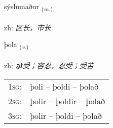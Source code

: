 \documentclass[frontgrid, backgrid]{flacards}\usepackage[]{graphicx}\usepackage[]{color}
\begin{document}
\renewcommand{\flhead}{\vskip5pt \fboxsep=0pt {\small\bfseries\footnotesize Nafnorð | 名词}}
\renewcommand{\fcfoot}{\vskip5pt \fboxsep=0pt \hspace{2pt}{\small\bfseries\footnotesize 2K}}

\renewcommand{\blhead}{\vskip5pt {\small\bfseries\footnotesize Nafnorð | 名词 }}
\renewcommand{\bcfoot}{\vskip5pt \hspace{2pt}{\small\bfseries\footnotesize 2K}}


{sýslumaður \small{\textsubscript{(\textit{m.})}} \\[1ex] %
\textphonetic{[sistlʏmaðʏr]} \\
zh: \emph{区长，市长} \\  [2ex]
\renewcommand*{\arraystretch}{0.8}
}

\renewcommand{\flhead}{\vskip5pt \fboxsep=0pt {\small\bfseries\footnotesize Sagnorð | 动词}}
\renewcommand{\fcfoot}{\vskip5pt \fboxsep=0pt \hspace{2pt}{\small\bfseries\footnotesize 2K}}

\renewcommand{\blhead}{\vskip5pt {\small\bfseries\footnotesize Sagnorð | 动词 }}
\renewcommand{\bcfoot}{\vskip5pt \hspace{2pt}{\small\bfseries\footnotesize 2K}}


{þola \small{\textsubscript{(\textit{v.})}} \\[1ex] %
\textphonetic{[θɔːla]} \\
zh: \emph{承受；容忍，忍受；受苦} \\  [2ex]
\renewcommand*{\arraystretch}{0.8}
\begin{tabular}{p{1cm}l}
\textsc{1sg}: & þoli -- þoldi -- þolað \\ 
\textsc{2sg}: & þolir -- þoldir -- þolað \\ 
\textsc{3sg}: & þolir -- þoldi -- þolað \\ 
\end{tabular}
}
\end{document}
